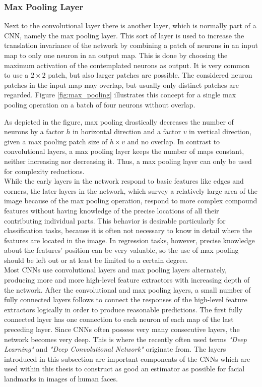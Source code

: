 \documentclass[11pt, a4paper]{article}
\newcommand\q[1]{\emph{"#1"}}
\begin{document}
\subsubsection{Max Pooling Layer}
\label{subsubsec:maxpoolinglayer}

Next to the convolutional layer there is another layer, which is normally part of a \ac{CNN}, namely the max pooling layer. This sort of layer is used to increase the translation invariance of the network by combining a patch of neurons in an input map to only one neuron in an output map. This is done by choosing the maximum activation of the contemplated neurons as output. It is very common to use a $2\times 2$ patch, but also larger patches are possible. The considered neuron patches in the input map may overlap, but usually only distinct patches are regarded. Figure \ref{fig:max_pooling} illustrates this concept for a single max pooling operation on a batch of four neurons without overlap.

As depicted in the figure, max pooling drastically decreases the number of neurons by a factor $h$ in horizontal direction and a factor $v$ in vertical direction, given a max pooling patch size of $h\times v$ and no overlap. In contrast to convolutional layers, a max pooling layer keeps the number of maps constant, neither increasing nor decreasing it. Thus, a max pooling layer can only be used for complexity reductions.\\
While the early layers in the network respond to basic features like edges and corners, the later layers in the network, which survey a relatively large area of the image because of the max pooling operation, respond to more complex compound features without having knowledge of the precise locations of all their contributing individual parts. This behavior is desirable particularly for classification tasks, because it is often not necessary to know in detail where the features are located in the image. In regression tasks, however, precise knowledge about the features' position can be very valuable, so the use of max pooling should be left out or at least be limited to a certain degree.\\
Most \acp{CNN} use convolutional layers and max pooling layers alternately, producing more and more high-level feature extractors with increasing depth of the network. After the convolutional and max pooling layers, a small number of fully connected layers follows to connect the responses of the high-level feature extractors logically in order to produce reasonable predictions. The first fully connected layer has one connection to each neuron of each map of the last preceding layer. Since \acp{CNN} often possess very many consecutive layers, the network becomes very deep. This is where the recently often used terms \q{Deep Learning} and \q{Deep Convolutional Network} originate from. The layers introduced in this subsection are important components of the CNNs which are used within this thesis to construct as good an estimator as possible for facial landmarks in images of human faces.
\newpage
\end{document}
